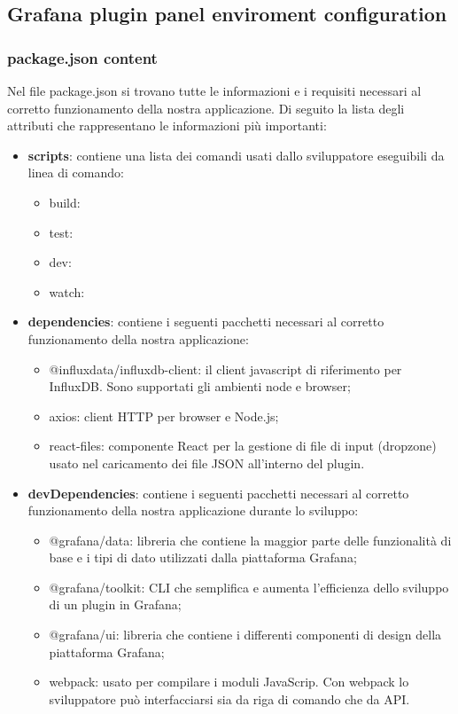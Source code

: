 	
	\subsection{Grafana plugin panel enviroment configuration}
	
	
		\subsubsection{package.json content}
		Nel file package.json si trovano tutte le informazioni e i requisiti necessari al corretto funzionamento della nostra applicazione. Di seguito la lista degli attributi che rappresentano le informazioni più importanti:
		\begin{itemize}
			\item\textbf{scripts}: contiene una lista dei comandi usati dallo sviluppatore eseguibili da linea di comando:
			\begin{itemize}
				\item build:
				\item test:
				\item dev:
				\item watch:
			\end{itemize}

			\item\textbf{dependencies}: contiene i seguenti pacchetti necessari al corretto funzionamento della nostra applicazione:
			\begin{itemize}
			 	\item @influxdata/influxdb-client: il client javascript di riferimento per InfluxDB. Sono supportati gli ambienti node e browser;
    			\item axios: client HTTP per browser e Node.js;
    			\item react-files: componente React per la gestione di file di input (dropzone) usato nel caricamento dei file JSON all'interno del plugin.
			\end{itemize}
			\item\textbf{devDependencies}: contiene i seguenti pacchetti necessari al corretto funzionamento della nostra applicazione durante lo sviluppo:
				\begin{itemize}
					\item @grafana/data: libreria che contiene la maggior parte delle funzionalità di base e i tipi di dato utilizzati dalla piattaforma Grafana;
					\item @grafana/toolkit: CLI che semplifica e aumenta l'efficienza dello sviluppo di un plugin in Grafana;
					\item @grafana/ui: libreria che contiene i differenti componenti di design della piattaforma Grafana;
					\item webpack: usato per compilare i moduli JavaScrip. Con webpack lo sviluppatore può interfacciarsi sia da riga di comando che da API.
				\end{itemize}
				
		\end{itemize}
		
